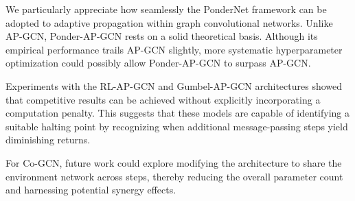 \documentclass{gdl}
\begin{document}
We particularly appreciate how seamlessly the PonderNet framework can be adopted to adaptive propagation within graph convolutional networks. Unlike AP-GCN, Ponder-AP-GCN rests on a solid theoretical basis. Although its empirical performance trails AP-GCN slightly, more systematic hyperparameter optimization could possibly allow Ponder-AP-GCN to surpass AP-GCN.

Experiments with the RL-AP-GCN and Gumbel-AP-GCN architectures showed that competitive results can be achieved without explicitly incorporating a computation penalty. This suggests that these models are capable of identifying a suitable halting point by recognizing when additional message-passing steps yield diminishing returns.

For Co-GCN, future work could explore modifying the architecture to share the environment network across steps, thereby reducing the overall parameter count and harnessing potential synergy effects.
\end{document}
